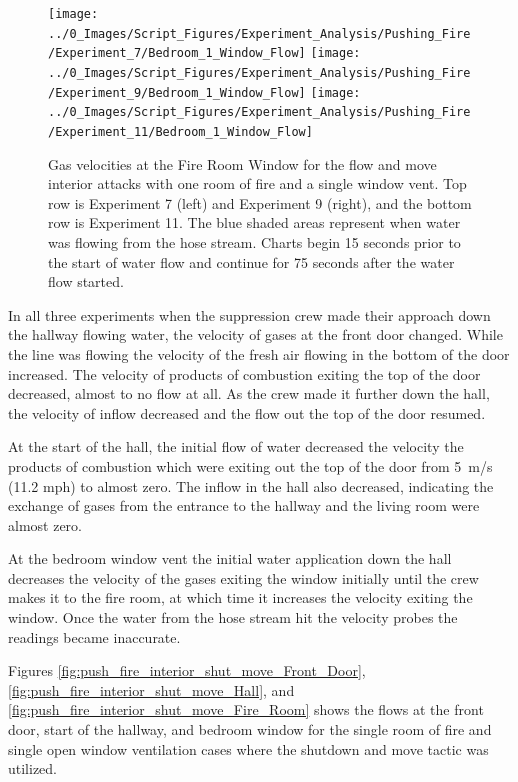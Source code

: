 \documentclass[12pt,oneside]{book}
\begin{document}
\begin{figure}[H]
\centering
\texttt{[image: ../0\_Images/Script\_Figures/Experiment\_Analysis/Pushing\_Fire/Experiment\_7/Bedroom\_1\_Window\_Flow]}
\texttt{[image: ../0\_Images/Script\_Figures/Experiment\_Analysis/Pushing\_Fire/Experiment\_9/Bedroom\_1\_Window\_Flow]}
\texttt{[image: ../0\_Images/Script\_Figures/Experiment\_Analysis/Pushing\_Fire/Experiment\_11/Bedroom\_1\_Window\_Flow]}
\caption[Gas Velocities - Single Room of Fire - Interior - Flow and Move]{Gas velocities at the Fire Room Window for the flow and move interior attacks with one room of fire and a single window vent. Top row is Experiment 7 (left) and Experiment 9 (right), and the bottom row is Experiment 11. The blue shaded areas represent when water was flowing from the hose stream. Charts begin 15 seconds prior to the start of water flow and continue for 75 seconds after the water flow started.}
\label{fig:push_fire_interior_flow_move_window}
\end{figure}

In all three experiments when the suppression crew made their approach down the hallway flowing water, the velocity of gases at the front door changed. While the line was flowing the velocity of the fresh air flowing in the bottom of the door increased. The velocity of products of combustion exiting the top of the door decreased, almost to no flow at a{}ll. As the crew made it further down the hall, the velocity of inflow decreased and the flow out the top of the door resumed. 

At the start of the hall, the initial flow of water decreased the velocity the products of combustion which were exiting out the top of the door from 5~m/s (11.2 mph) to almost zero. The inflow in the hall also decreased, indicating the exchange of gases from the entrance to the hallway and the living room were almost zero. 

At the bedroom window vent the initial water application down the hall decreases the velocity of the gases exiting the window initially until the crew makes it to the fire room, at which time it increases the velocity exiting the window. Once the water from the hose stream hit the velocity probes the readings became inaccurate. 

Figures \ref{fig:push_fire_interior_shut_move_Front_Door}, \ref{fig:push_fire_interior_shut_move_Hall}, and \ref{fig:push_fire_interior_shut_move_Fire_Room} shows the flows at the front door, start of the hallway, and bedroom window for the single room of fire and single open window ventilation cases where the shutdown and move tactic was utilized. 
\end{document}
